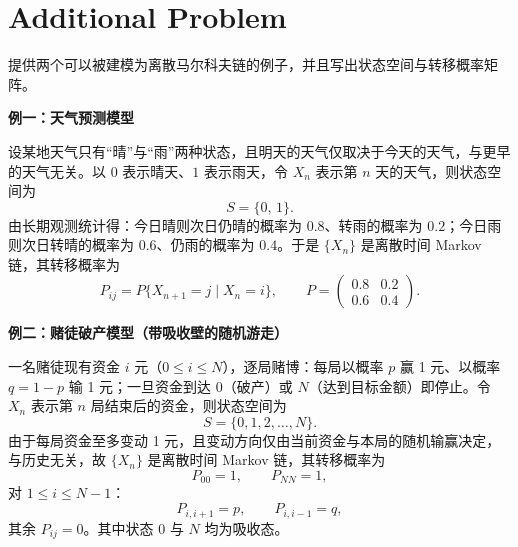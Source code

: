\documentclass[12pt,a4paper]{article}
\begin{document}
\section{Additional Problem}

提供两个可以被建模为离散马尔科夫链的例子，并且写出状态空间与转移概率矩阵。

\begin{answerbox}
    
\textbf{例一：天气预测模型}

设某地天气只有“晴”与“雨”两种状态，且明天的天气仅取决于今天的天气，与更早的天气无关。以 $0$ 表示晴天、$1$ 表示雨天，令 $X_n$ 表示第 $n$ 天的天气，则状态空间为
\[
S=\{0,\,1\}.
\]
由长期观测统计得：今日晴则次日仍晴的概率为 $0.8$、转雨的概率为 $0.2$；今日雨则次日转晴的概率为 $0.6$、仍雨的概率为 $0.4$。于是 $\{X_n\}$ 是离散时间 Markov 链，其转移概率为
\[
P_{ij}=P\{X_{n+1}=j \mid X_n=i\},
\qquad
P=\begin{pmatrix}
0.8 & 0.2\\[2pt]
0.6 & 0.4
\end{pmatrix}.
\]

\textbf{例二：赌徒破产模型（带吸收壁的随机游走）}

一名赌徒现有资金 $i$ 元（$0\le i\le N$），逐局赌博：每局以概率 $p$ 赢 1 元、以概率 $q=1-p$ 输 1 元；一旦资金到达 $0$（破产）或 $N$（达到目标金额）即停止。令 $X_n$ 表示第 $n$ 局结束后的资金，则状态空间为
\[
S=\{0,1,2,\ldots,N\}.
\]
由于每局资金至多变动 1 元，且变动方向仅由当前资金与本局的随机输赢决定，与历史无关，故 $\{X_n\}$ 是离散时间 Markov 链，其转移概率为
\[
P_{00}=1,\qquad P_{NN}=1,
\]
对 $1\le i\le N-1$：
\[
P_{i,i+1}=p,\qquad P_{i,i-1}=q,
\]
其余 $P_{ij}=0$。其中状态 $0$ 与 $N$ 均为吸收态。
\end{answerbox}
\end{document}

